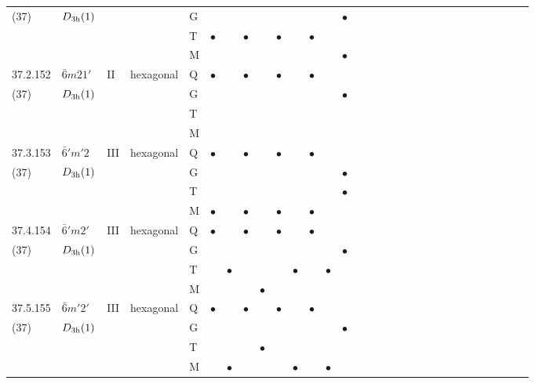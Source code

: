 \documentclass[fleqn,9pt,landscape]{jsarticle}
\begin{document}
\begin{longtable}{lllll|l|l|l|l|l|l|l|l|l|ll|ll|ll|ll|ll|ll|ll|ll}
(37) & $D_{\rm 3h}(1)$ &  &  & G &  &  &  &  &  &  &  &  & $\bullet$ &  &  &  &  &  &  &  &  &  &  &  &  &  &  &  &  \\
 &  &  &  & T & $\bullet$ &  & $\bullet$ &  & $\bullet$ &  & $\bullet$ &  &  &  &  &  &  &  &  &  &  &  &  &  &  &  &  &  &  \\
 &  &  &  & M &  &  &  &  &  &  &  &  & $\bullet$ &  &  &  &  &  &  &  &  &  &  &  &  &  &  &  &  \\ \hline
37.2.152 & \texttt{$\bar{6}m21'$} & II & hexagonal & Q & $\bullet$ &  & $\bullet$ &  & $\bullet$ &  & $\bullet$ &  &  &  &  &  &  &  &  &  &  &  &  &  &  &  &  &  &  \\
(37) & $D_{\rm 3h}(1)$ &  &  & G &  &  &  &  &  &  &  &  & $\bullet$ &  &  &  &  &  &  &  &  &  &  &  &  &  &  &  &  \\
 &  &  &  & T &  &  &  &  &  &  &  &  &  &  &  &  &  &  &  &  &  &  &  &  &  &  &  &  &  \\
 &  &  &  & M &  &  &  &  &  &  &  &  &  &  &  &  &  &  &  &  &  &  &  &  &  &  &  &  &  \\ \hline
37.3.153 & \texttt{$\bar{6}'m'2$} & III & hexagonal & Q & $\bullet$ &  & $\bullet$ &  & $\bullet$ &  & $\bullet$ &  &  &  &  &  &  &  &  &  &  &  &  &  &  &  &  &  &  \\
(37) & $D_{\rm 3h}(1)$ &  &  & G &  &  &  &  &  &  &  &  & $\bullet$ &  &  &  &  &  &  &  &  &  &  &  &  &  &  &  &  \\
 &  &  &  & T &  &  &  &  &  &  &  &  & $\bullet$ &  &  &  &  &  &  &  &  &  &  &  &  &  &  &  &  \\
 &  &  &  & M & $\bullet$ &  & $\bullet$ &  & $\bullet$ &  & $\bullet$ &  &  &  &  &  &  &  &  &  &  &  &  &  &  &  &  &  &  \\ \hline
37.4.154 & \texttt{$\bar{6}'m2'$} & III & hexagonal & Q & $\bullet$ &  & $\bullet$ &  & $\bullet$ &  & $\bullet$ &  &  &  &  &  &  &  &  &  &  &  &  &  &  &  &  &  &  \\
(37) & $D_{\rm 3h}(1)$ &  &  & G &  &  &  &  &  &  &  &  & $\bullet$ &  &  &  &  &  &  &  &  &  &  &  &  &  &  &  &  \\
 &  &  &  & T &  & $\bullet$ &  &  &  & $\bullet$ &  & $\bullet$ &  &  &  &  &  &  &  &  &  &  &  &  &  &  &  &  &  \\
 &  &  &  & M &  &  &  & $\bullet$ &  &  &  &  &  &  &  &  &  &  &  &  &  &  &  &  &  &  &  &  &  \\ \hline
37.5.155 & \texttt{$\bar{6}m'2'$} & III & hexagonal & Q & $\bullet$ &  & $\bullet$ &  & $\bullet$ &  & $\bullet$ &  &  &  &  &  &  &  &  &  &  &  &  &  &  &  &  &  &  \\
(37) & $D_{\rm 3h}(1)$ &  &  & G &  &  &  &  &  &  &  &  & $\bullet$ &  &  &  &  &  &  &  &  &  &  &  &  &  &  &  &  \\
 &  &  &  & T &  &  &  & $\bullet$ &  &  &  &  &  &  &  &  &  &  &  &  &  &  &  &  &  &  &  &  &  \\
 &  &  &  & M &  & $\bullet$ &  &  &  & $\bullet$ &  & $\bullet$ &  &  &  &  &  &  &  &  &  &  &  &  &  &  &  &  &  \\
\end{longtable}
\end{document}
